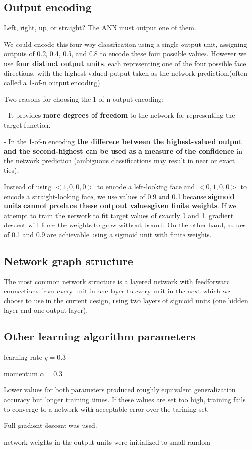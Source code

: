 \subsection*{Output encoding}

Left, right, up, or straight? The ANN must output one of them.

We could encode this four-way classification using a single output unit, assigning outputs of 0.2, 0.4, 0.6, and 0.8 to encode these four possible values. However we use \textbf{four distinct output units}, each representing one of the four possible face directions, with the highest-valued putput taken as the network prediction.(often called a 1-of-n output encoding)

Two reasons for choosing the 1-of-n output encoding:

- It provides \textbf{more degrees of freedom} to the network for representing the target function.

- In the 1-of-n encoding \textbf{the differece between the highest-valued output and the second-highest can be used as a measure of the confidence} in the network prediction (ambiguous classifications may result in near or exact ties).

Instead of using $<1,0,0,0>$ to encode a left-looking face and $<0,1,0,0>$ to encode a straight-looking face, we use values of 0.9 and 0.1 because \textbf{sigmoid units cannot produce these outpout valuesgiven finite weights}. If we attempt to train the network to fit target values of exactly 0 and 1, gradient descent will force the weights to grow without bound. On the other hand, values of 0.1 and 0.9 are achievable using a sigmoid unit with finite weights.

\subsection*{Network graph structure}

The most common network structure is a layered network with feedforward connections from every unit in one layer to every unit in the next which we choose to use in the current design, using two layers of sigmoid units (one hidden layer and one output layer).

\subsection*{Other learning algorithm parameters}

learning rate $\eta = 0.3$

momentum $\alpha = 0.3$

Lower values for both parameters produced roughly equivalent generalization accuracy but longer training times. If these values are set too high, training fails to converge to a network with acceptable error over the tarining set.

Full gradient descent was used.

network weights in the output units were initialized to small random




